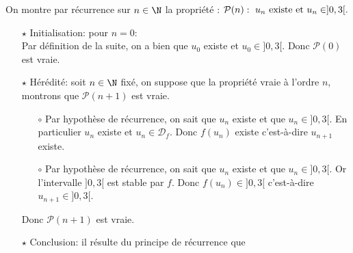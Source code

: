 \begin{correction}
\begin{enumerate}
\begin{enumerate}
On montre par r\'ecurrence sur $n\in\N$ la propri\'et\'e : $\mathcal{P}(n):\ u_n\ \hbox{existe et}\ u_n\in\rbrack 0,3\lbrack.$
\begin{itemize}
\item[$\star$] Initialisation: pour $n=0$:\\
\noindent Par d\'efinition de la suite, on a bien que $u_0$ existe et $u_0\in\rbrack 0,3\lbrack$. Donc $\mathcal{P}(0)$ est vraie.
\item[$\star$] H\'er\'edit\'e: soit $n\in\N$ fix\'e, on suppose que la propri\'et\'e vraie \`{a} l'ordre $n$, montrons que $\mathcal{P}(n+1)$ est vraie.
\begin{itemize}
\item[$\circ$] Par hypoth\`{e}se de r\'ecurrence, on sait que $u_n$ existe et que $u_n\in\rbrack 0,3\lbrack$. En particulier $u_n$ existe et $u_n\in\mathcal{D}_f$. Donc $f(u_n)$ existe c'est-\`{a}-dire $u_{n+1}$ existe.
\item[$\circ$] Par hypoth\`{e}se de r\'ecurrence, on sait que $u_n$ existe et que $u_n\in\rbrack 0,3\lbrack$. Or l'intervalle $\rbrack 0,3\lbrack$ est stable par $f$. Donc $f(u_n)\in\rbrack 0,3\lbrack$ c'est-\`{a}-dire $u_{n+1}\in\rbrack 0,3\lbrack$.
\end{itemize}
Donc $\mathcal{P}(n+1)$ est vraie.
\item[$\star$] Conclusion: il r\'esulte du principe de r\'ecurrence que 



\end{itemize}
\end{enumerate}
\end{enumerate}
\end{correction}
